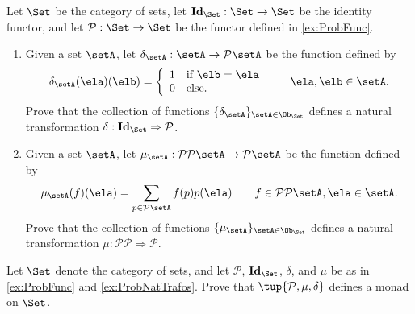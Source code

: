 \documentclass[paper=8.125in:10.250in,pagesize=pdftex,
    headinclude=false,footinclude=false,oneside,egregdoesnotlikesansseriftitles]{kaobook}
\begin{document}

\newpage


\begin{gradedexercise}\label{ex:ProbNatTrafos}
Let $\Set$ be the category of sets, let $\mathbf{Id}_\Set : \Set \to \Set$ be the identity functor, and let $\mathcal{P}: \Set \to \Set$ be the functor defined in \cref{ex:ProbFunc}. 
\begin{enumerate}
\item Given a set $\setA$, let $\delta_{\setA} : \setA \to \mathcal{P} \setA$ be the function defined by
$$\delta_\setA (\ela)(\elb) = \left\{\begin{array}{ll}
        1 & \text{if } \elb = \ela \\
        0 & \text{else.} 
        \end{array}\right. 
  \quad \quad \ela, \elb \in \setA.$$
Prove that the collection of functions $\{ \delta_{\setA} \}_{\setA \in \Ob_{\Set}}$ defines a natural transformation $\delta: \mathbf{Id}_\Set \Rightarrow \mathcal{P}$. 
\item Given a set $\setA$, let $\mu_\setA : \mathcal{P} \mathcal{P} \setA \to \mathcal{P} \setA$ be the function defined by 
$$\mu_\setA (f)(\ela) = \sum_{p \in \mathcal{P} \setA} f(p) p(\ela) \quad \quad f \in \mathcal{P} \mathcal{P} \setA, \ela \in \setA.$$
Prove that the collection of functions $\{ \mu_{\setA} \}_{\setA \in \Ob_{\Set}}$ defines a natural transformation $\mu: \mathcal{P} \mathcal{P} \Rightarrow \mathcal{P}$. 
\end{enumerate}
\end{gradedexercise}


\newpage


\begin{gradedexercise}\label{ex:ProbMonad}
Let $\Set$ denote the category of sets, and let $\mathcal{P}$, $\mathbf{Id}_\Set$, $\delta$, and $\mu$ be as in \cref{ex:ProbFunc} and \cref{ex:ProbNatTrafos}. 
Prove that $\tup{\mathcal{P}, \mu, \delta}$ defines a monad on $\Set$. 
\end{gradedexercise}


\newpage
\end{document}

